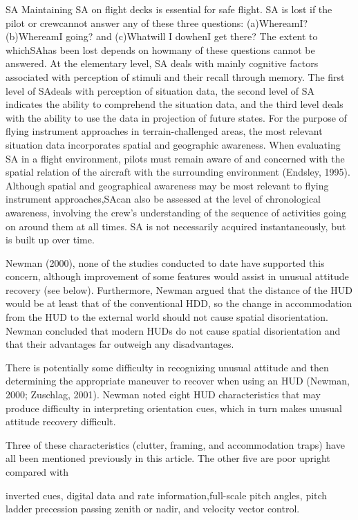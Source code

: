 \documentclass[utf8,bachelor,manualbib]{gradu3}
\begin{document}
SA
Maintaining SA on flight decks is essential for safe flight. SA is lost if the pilot or
crewcannot answer any of these three questions: (a)WhereamI? (b)WhereamI going?
and (c)Whatwill I dowhenI get there? The extent to whichSAhas been lost depends
on howmany of these questions cannot be answered. At the elementary level,
SA deals with mainly cognitive factors associated with perception of stimuli and
their recall through memory. The first level of SAdeals with perception of situation
data, the second level of SA indicates the ability to comprehend the situation data,
and the third level deals with the ability to use the data in projection of future states.
For the purpose of flying instrument approaches in terrain-challenged areas, the
most relevant situation data incorporates spatial and geographic awareness. When
evaluating SA in a flight environment, pilots must remain aware of and concerned
with the spatial relation of the aircraft with the surrounding environment (Endsley,
1995). Although spatial and geographical awareness may be most relevant to flying
instrument approaches,SAcan also be assessed at the level of chronological awareness,
involving the crew’s understanding of the sequence of activities going on
around them at all times. SA is not necessarily acquired instantaneously, but is built
up over time. \citep{schnell2004}


Newman (2000), none
of the studies conducted to date have supported this concern, although improvement
of some features would assist in unusual attitude recovery (see below).
Furthermore, Newman argued that the distance of the HUD would be at least
that of the conventional HDD, so the change in accommodation from the HUD
to the external world should not cause spatial disorientation. Newman concluded
that modern HUDs do not cause spatial disorientation and that their advantages
far outweigh any disadvantages.


There is potentially some difficulty in recognizing unusual attitude and then determining
the appropriate maneuver to recover when using an HUD (Newman,
2000; Zuschlag, 2001).
Newman noted eight HUD characteristics that may produce
difficulty in interpreting orientation cues, which in turn makes unusual attitude
recovery difficult.

Three of these characteristics (clutter, framing, and
accommodation traps) have all been mentioned previously in this article. The other
five are poor upright compared with

inverted cues, digital data and rate information,full-scale pitch angles, pitch ladder precession passing zenith or nadir, and
velocity vector control.
\end{document}

